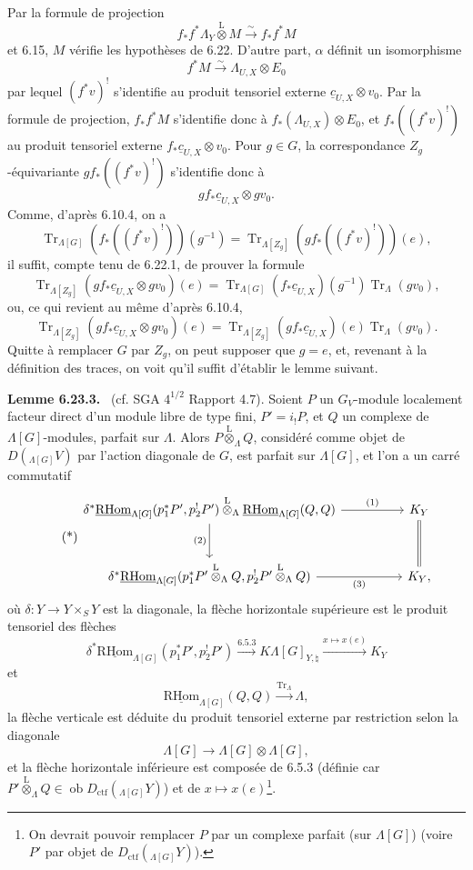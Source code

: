 \documentclass[11pt]{article}
\newenvironment{statement}[1]{\par\medskip\noindent\textbf{#1.}\ }{\par\medskip}
\newcommand{\R}{\mathrm{R}}\newcommand{\RHomCore}{\mathrm{RHom}}
\newcommand{\ob}{\operatorname{ob}}
\providecommand{\RHom}{\RHomCore}
\providecommand{\uRHom}{\underline{\RHom}}
\providecommand{\Tr}{\operatorname{Tr}}
\providecommand{\Tr}{\operatorname{Tr}}
\providecommand{\lten}{\overset{\mathrm L}{\otimes}}
\providecommand{\Tr}{\operatorname{Tr}}
\providecommand{\RHom}{\RHomCore}
\providecommand{\ob}{\operatorname{ob}}
\providecommand{\lten}{\overset{\mathrm L}{\otimes}}
\providecommand{\RHom}{\R\mathcal{H}om}
\providecommand{\lten}{\overset{\mathrm L}{\otimes}}
\providecommand{\R}{\mathrm R}
\providecommand{\Tr}{\operatorname{Tr}}
\providecommand{\lten}{\overset{\mathrm L}{\otimes}}
\providecommand{\lten}{\overset{\mathrm L}{\otimes}}
\providecommand{\lten}{\overset{\mathrm L}{\otimes}}
\providecommand{\RHom}{\RHomCore}
\providecommand{\Tr}{\operatorname{Tr}}
\providecommand{\lten}{\overset{\mathrm L}{\otimes}}
\begin{document}
Par la formule de projection
\[
f_*f^*\Lambda_Y\lten M\xrightarrow{\sim}f_*f^*M
\]
et 6.15, $M$ vérifie les hypothèses de 6.22. D'autre part, $\alpha$ définit un isomorphisme
\[
f^*M\xrightarrow{\sim}\Lambda_{U,X}\otimes E_0
\]
par lequel $(f^*v)^!$ s'identifie au produit tensoriel externe $\underline c_{U,X}\otimes v_0$. Par la formule de projection, $f_*f^*M$ s'identifie donc à $f_*(\Lambda_{U,X})\otimes E_0$, et $f_*((f^*v)^!)$ au produit tensoriel externe $f_*\underline c_{U,X}\otimes v_0$. Pour $g\in G$, la correspondance $Z_g$-équivariante $gf_*((f^*v)^!)$ s'identifie donc à
\[
gf_*\underline c_{U,X}\otimes gv_0.
\]
Comme, d'après 6.10.4, on a
\[
\Tr_{\Lambda[G]}(f_*((f^*v)^!))(g^{-1})
=
\Tr_{\Lambda[Z_g]}(gf_*((f^*v)^!))(e),
\]
il suffit, compte tenu de 6.22.1, de prouver la formule
\[
\Tr_{\Lambda[Z_g]}(gf_*\underline c_{U,X}\otimes gv_0)(e)
=
\Tr_{\Lambda[G]}(f_*\underline c_{U,X})(g^{-1})\Tr_{\Lambda}(gv_0),
\]
ou, ce qui revient au même d'après 6.10.4,
\begin{equation}
\Tr_{\Lambda[Z_g]}(gf_*\underline c_{U,X}\otimes gv_0)(e)
=
\Tr_{\Lambda[Z_g]}(gf_*\underline c_{U,X})(e)\Tr_{\Lambda}(gv_0).
\tag{6.23.2}
\end{equation}
Quitte à remplacer $G$ par $Z_g$, on peut supposer que $g=e$, et, revenant à la définition des traces, on voit qu'il suffit d'établir le lemme suivant.

\begin{statement}{Lemme 6.23.3}
(cf. SGA $4^{1/2}$ Rapport 4.7). Soient $P$ un $G_V$-module localement facteur direct d'un module libre de type fini, $P'=i_!P$, et $Q$ un complexe de $\Lambda[G]$-modules, parfait sur $\Lambda$. Alors $P\lten_{\Lambda}Q$, considéré comme objet de $D({}_{\Lambda[G]}V)$ par l'action diagonale de $G$, est parfait sur $\Lambda[G]$, et l'on a un carré commutatif
\begin{equation}
\tag{*}
\begin{tikzcd}[column sep=huge,row sep=large]
\delta^*\uRHom_{\Lambda[G]}(p_1^*P',p_2^!P')\lten_{\Lambda}
\uRHom_{\Lambda[G]}(Q,Q) \arrow[r,"(1)"] \arrow[d,"(2)"']
& K_Y \arrow[d,equal]\\
\delta^*\uRHom_{\Lambda[G]}(p_1^*P'\lten_{\Lambda}Q,p_2^!P'\lten_{\Lambda}Q) \arrow[r,"(3)"']
& K_Y ,
\end{tikzcd}
\end{equation}
où $\delta:Y\to Y\times_SY$ est la diagonale, la flèche horizontale supérieure est le produit tensoriel des flèches
\[
\delta^*\uRHom_{\Lambda[G]}(p_1^*P',p_2^!P')\xrightarrow{6.5.3}
K\Lambda[G]_{Y,\natural}\xrightarrow{x\mapsto x(e)}K_Y
\]
et
\[
\uRHom_{\Lambda[G]}(Q,Q)\xrightarrow{\Tr_{\Lambda}}\Lambda,
\]
la flèche verticale est déduite du produit tensoriel externe par restriction selon la diagonale
\[
\Lambda[G]\to\Lambda[G]\otimes\Lambda[G],
\]
et la flèche horizontale inférieure est composée de 6.5.3 (définie car $P'\lten_{\Lambda}Q\in\ob D_{\mathrm{ctf}}({}_{\Lambda[G]}Y)$) et de $x\mapsto x(e)$\footnote{On devrait pouvoir remplacer $P$ par un complexe parfait (sur $\Lambda[G]$) (voire $P'$ par objet de $D_{\mathrm{ctf}}({}_{\Lambda[G]}Y)$).}.
\end{statement}
\end{document}
